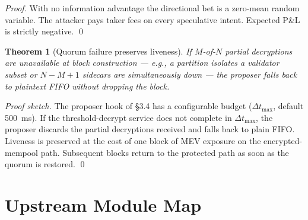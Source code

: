 \documentclass[11pt,a4paper]{article}
\newtheorem{theorem}{Theorem}
\begin{document}
\begin{proof}
With no information advantage the directional bet is a zero-mean
random variable. The attacker pays taker fees on every speculative
intent. Expected P\&L is strictly negative. \qed
\end{proof}

\begin{theorem}[Quorum failure preserves liveness]
\label{thm:quorum-fail}
If $M$-of-$N$ partial decryptions are unavailable at block
construction --- e.g., a partition isolates a validator subset or
$N-M+1$ sidecars are simultaneously down --- the proposer falls
back to plaintext FIFO without dropping the block.
\end{theorem}

\begin{proof}[Proof sketch]
The proposer hook of \S3.4 has a configurable budget
($\Delta t_{\max}$, default 500~ms). If the threshold-decrypt
service does not complete in $\Delta t_{\max}$, the proposer
discards the partial decryptions received and falls back to plain
FIFO. Liveness is preserved at the cost of one block of MEV
exposure on the encrypted-mempool path. Subsequent blocks return
to the protected path as soon as the quorum is restored. \qed
\end{proof}

\section{Upstream Module Map}
\label{sec:upstream-map}
\end{document}
